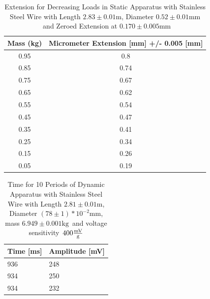 \documentclass[]{article}
\newcommand{\staticWireDiameter}{\ensuremath{0.52 \pm 0.01 \si{\milli\meter}}}
\newcommand{\staticWireLength}{\ensuremath{2.83 \pm 0.01 \si{\meter}}}
\newcommand{\zero}{\ensuremath{0.170 \pm 0.005 \si{\milli\meter}}}
\newcommand{\dynamicWireDiameter}{\ensuremath{(78 \pm 1)*10^{-2} \si{\milli\meter}}}
\newcommand{\dynamicWireLength}{\ensuremath{2.81 \pm 0.01 \si{\meter}}}
\newcommand{\M}{\ensuremath{6.949 \pm 0.001\si{\kilo\gram}}}
\newcommand{\sensitivity}{\ensuremath{400\si{\frac{\milli\volt}{g}}}}
\begin{document}
\begin{table}[H]
    \centering
    \caption{Extension for Decreasing Loads in Static Apparatus with Stainless
    Steel Wire with Length \staticWireLength, Diameter \staticWireDiameter~and
    Zeroed Extension at \zero}\label{tab:decreasing}
    \begin{tabular}{@{}cc@{}}
        \toprule
        Mass (kg) & Micrometer Extension {[}mm{]} +/- 0.005 {[}mm{]} \\ \midrule
        0.95      & 0.8                                              \\
        0.85      & 0.74                                             \\
        0.75      & 0.67                                             \\
        0.65      & 0.62                                             \\
        0.55      & 0.54                                             \\
        0.45      & 0.47                                             \\
        0.35      & 0.41                                             \\
        0.25      & 0.34                                             \\
        0.15      & 0.26                                             \\
        0.05      & 0.19                                             \\ \bottomrule
    \end{tabular}
\end{table}

\begin{table}[H]
    \centering
    \caption{Time for 10 Periods of Dynamic Apparatus with Stainless
    Steel Wire with Length \dynamicWireLength, Diameter \dynamicWireDiameter,
    mass \M~and voltage sensitivity~\sensitivity}\label{tab:dynamic}
    \begin{tabular}{@{}ll@{}}
        \toprule
        Time {[}ms{]} & Amplitude {[}mV{]} \\ \midrule
        936           & 248                \\
        934           & 250                \\
        934           & 232                \\ \bottomrule
    \end{tabular}
\end{table}
\end{document}
